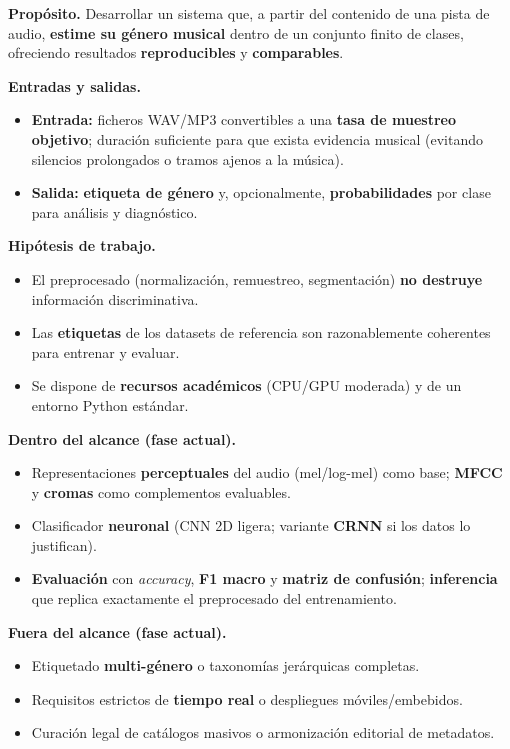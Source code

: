 \documentclass[12pt,twoside]{article}
\begin{document}
\textbf{Propósito.} Desarrollar un sistema que, a partir del contenido de una pista de audio, \textbf{estime su género musical} dentro de un conjunto finito de clases, ofreciendo resultados \textbf{reproducibles} y \textbf{comparables}.

\textbf{Entradas y salidas.}
\begin{itemize}
  \item \textbf{Entrada:} ficheros WAV/MP3 convertibles a una \textbf{tasa de muestreo objetivo}; duración suficiente para que exista evidencia musical (evitando silencios prolongados o tramos ajenos a la música).
  \item \textbf{Salida:} \textbf{etiqueta de género} y, opcionalmente, \textbf{probabilidades} por clase para análisis y diagnóstico.
\end{itemize}

\textbf{Hipótesis de trabajo.}
\begin{itemize}
  \item El preprocesado (normalización, remuestreo, segmentación) \textbf{no destruye} información discriminativa.
  \item Las \textbf{etiquetas} de los datasets de referencia son razonablemente coherentes para entrenar y evaluar.
  \item Se dispone de \textbf{recursos académicos} (CPU/GPU moderada) y de un entorno Python estándar.
\end{itemize}

\textbf{Dentro del alcance (fase actual).}
\begin{itemize}
  \item Representaciones \textbf{perceptuales} del audio (mel/log-mel) como base; \textbf{MFCC} y \textbf{cromas} como complementos evaluables.
  \item Clasificador \textbf{neuronal} (CNN 2D ligera; variante \textbf{CRNN} si los datos lo justifican).
  \item \textbf{Evaluación} con \textit{accuracy}, \textbf{F1 macro} y \textbf{matriz de confusión}; \textbf{inferencia} que replica exactamente el preprocesado del entrenamiento.
\end{itemize}

\textbf{Fuera del alcance (fase actual).}
\begin{itemize}
  \item Etiquetado \textbf{multi-género} o taxonomías jerárquicas completas.
  \item Requisitos estrictos de \textbf{tiempo real} o despliegues móviles/embebidos.
  \item Curación legal de catálogos masivos o armonización editorial de metadatos.
\end{itemize}
\end{document}
